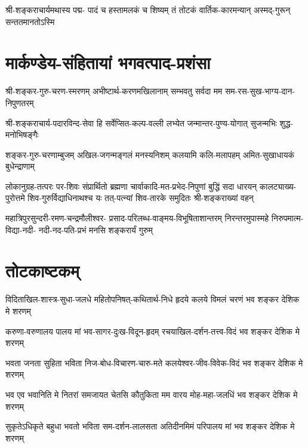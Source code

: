 \fourlineindentedshloka
{श्री-शङ्कराचार्यमथास्य पद्म-}
{पादं च हस्तामलकं च शिष्यम्}
{तं तोटकं वार्तिक-कारमन्यान्}
{अस्मद्-गुरून् सन्ततमानतोऽस्मि}



\section{मार्कण्डेय-संहितायां भगवत्पाद-प्रशंसा}

\twolineshloka
{श्री-शङ्कर-गुरु-चरण-स्मरणम् अभीष्टार्थ-करणमखिलानाम्}
{सम्भवतु सर्वदा मम सम-रस-सुख-भाग्य-दान-निपुणतरम्}

\twolineshloka
{श्री-शङ्कराचार्य-पदारविन्द-सेवा हि सर्वेप्सित-कल्प-वल्ली}
{लभ्येत जन्मान्तर-पुण्य-योगात् सुजन्मभिः शुद्ध-मनोभिषङ्गैः}

\twolineshloka
{शङ्कर-गुरु-चरणाम्बुजम् अखिल-जगन्मङ्गलं मनस्यनिशम्}
{कलयामि कलि-मलापहम् अमित-सुखाधायकं बुधेन्द्राणाम्}

\fourlineindentedshloka
{लोकानुग्रह-तत्परः पर-शिवः संप्रार्थितो ब्रह्मणा}
{चार्वाकादि-मत-प्रभेद-निपुणां बुद्धिं सदा धारयन्}
{कालट्याख्य-पुरोत्तमे शिव-गुरुर्विद्याधिनाथश्च यः}
{तत्-पत्न्यां शिव-तारके समुदितः श्री-शङ्कराख्यां वहन्}

\fourlineindentedshloka
{महात्रिपुरसुन्दरी-रमण-चन्द्रमौलीश्वर-}
{प्रसाद-परिलब्ध-वाङ्मय-विभूषिताशान्तरम्}
{निरन्तरमुपास्महे निरुपमात्म-विद्या-नदी-}
{नदी-नद-पति-प्रभं मनसि शङ्करार्यं गुरुम्}


\section{तोटकाष्टकम्}

\twolineshloka
{विदिताखिल-शास्त्र-सुधा-जलधे महितोपनिषत्-कथितार्थ-निधे}
{हृदये कलये विमलं चरणं भव शङ्कर देशिक मे शरणम्}

\twolineshloka
{करुणा-वरुणालय पालय मां भव-सागर-दुःख-विदून-हृदम्}
{रचयाखिल-दर्शन-तत्त्व-विदं भव शङ्कर देशिक मे शरणम्}

\twolineshloka
{भवता जनता सुहिता भविता निज-बोध-विचारण-चारु-मते}
{कलयेश्वर-जीव-विवेक-विदं भव शङ्कर देशिक मे शरणम्}

\twolineshloka
{भव एव भवानिति मे नितरां समजायत चेतसि कौतुकिता}
{मम वारय मोह-महा-जलधिं भव शङ्कर देशिक मे शरणम्}

\twolineshloka
{सुकृतेऽधिकृते बहुधा भवतो भविता सम-दर्शन-लालसता}
{अतिदीनमिमं परिपालय मां भव शङ्कर देशिक मे शरणम्}

